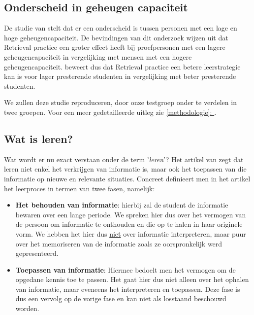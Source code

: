 \documentclass{hogent-article}
\newcommand{\customref}[1]{\underline{\ref{#1}: \nameref{#1}}}
\begin{document}
\subsection{Onderscheid in geheugen capaciteit}
\label{geheugencapaciteit}
De studie van \textcite{Agarwal_2016} stelt dat er een onderscheid is tussen personen met een lage en hoge geheugencapaciteit. De bevindingen van dit onderzoek wijzen uit dat Retrieval practice een groter effect heeft bij proefpersonen met een lagere geheugencapaciteit in vergelijking met mensen met een hogere geheugencapaciteit. \textcite{Agarwal_2016} beweert dus dat Retrieval practice een betere leerstrategie kan is voor lager presterende studenten in vergelijking met beter presterende studenten.\\
\par
\noindent
We zullen deze studie reproduceren, door onze testgroep onder te verdelen in twee groepen. Voor een meer gedetailleerde uitleg zie \customref{methodologie}.

\subsection{Wat is leren?}
Wat wordt er nu exact verstaan onder de term '\textit{leren}'? Het artikel van \textcite{Mayer_2002} zegt dat leren niet enkel het verkrijgen van informatie is, maar ook het toepassen van die informatie op nieuwe en relevante situaties. Concreet definieert men in het artikel het leerproces in termen van twee fasen, namelijk:\\

\begin{itemize}
	\item \textbf{Het behouden van informatie}: hierbij zal de student de informatie bewaren over een lange periode. We spreken hier dus over het vermogen van de persoon om informatie te onthouden en die op te halen in haar originele vorm. We hebben het hier dus \underline{niet} over informatie interpreteren, maar puur over het memoriseren van de informatie zoals ze oorspronkelijk werd gepresenteerd.\\
	
	\item \textbf{Toepassen van informatie}: Hiermee bedoelt men het vermogen om de opgedane kennis toe te passen. Het  gaat hier dus niet alleen over het ophalen van informatie, maar eveneens het interpreteren en toepassen. Deze fase is dus een vervolg op de vorige fase en kan niet als losstaand beschouwd worden.
\end{itemize}
\end{document}
